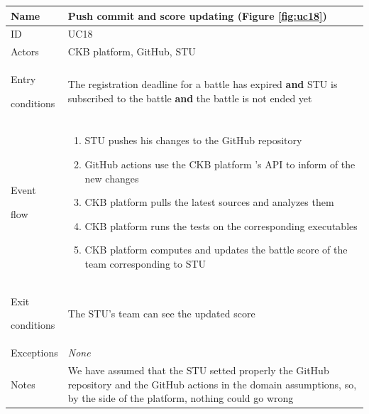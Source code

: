 \begin{center}
    \def\arraystretch{1.5}
    \begin{tabular}{| m{2cm} | m{10cm}|}
        \hline
        Name                  & Push commit and score updating (Figure \ref{fig:uc18})                                                                                                                       \\ \hline
        ID                    & UC18                                                                                                                                                                         \\ \hline
        Actors                & CKB platform, GitHub, STU                                                                                                                                                    \\ \hline
        Entry \par conditions & The registration deadline for a battle has expired \textbf{and} STU is subscribed to the battle \textbf{and} the battle is not ended yet                                     \\ \hline
        Event \par flow       & \begin{enumerate}
                                    \item STU pushes his changes to the GitHub repository
                                    \item GitHub actions use the CKB platform 's API to inform of the new changes
                                    \item CKB platform pulls the latest sources and analyzes them
                                    \item CKB platform runs the tests on the corresponding executables
                                    \item CKB platform computes and updates the battle score of the team corresponding to STU
                                \end{enumerate}                                                                                     \\ \hline
        Exit \par conditions  & The STU's team can see the updated score                                                                                                                                     \\ \hline
        Exceptions            & \textit{None}                                                                                                                                                                \\ \hline
        Notes                 & We have assumed that the STU setted properly the GitHub repository and the GitHub actions in the domain assumptions, so, by the side of the platform, nothing could go wrong \\ \hline
    \end{tabular}
\end{center}

